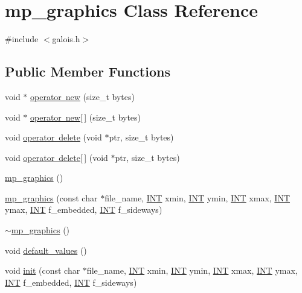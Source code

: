 \hypertarget{classmp__graphics}{}\section{mp\+\_\+graphics Class Reference}
\label{classmp__graphics}


{\ttfamily \#include $<$galois.\+h$>$}

\subsection*{Public Member Functions}
\begin{DoxyCompactItemize}
\item 
void $\ast$ \mbox{\hyperlink{classmp__graphics_a99f12c4a1faf7d84e64ad089e59bd43a}{operator new}} (size\+\_\+t bytes)
\item 
void $\ast$ \mbox{\hyperlink{classmp__graphics_a673779553f1615a209f393b56b7cd238}{operator new\mbox{[}$\,$\mbox{]}}} (size\+\_\+t bytes)
\item 
void \mbox{\hyperlink{classmp__graphics_a6837492938bddfa1192c3c68cc4c7626}{operator delete}} (void $\ast$ptr, size\+\_\+t bytes)
\item 
void \mbox{\hyperlink{classmp__graphics_a002d6cbdfd131c2925e1083781a9c8af}{operator delete\mbox{[}$\,$\mbox{]}}} (void $\ast$ptr, size\+\_\+t bytes)
\item 
\mbox{\hyperlink{classmp__graphics_abe331bd484651f2b734167ff09a30858}{mp\+\_\+graphics}} ()
\item 
\mbox{\hyperlink{classmp__graphics_af6b0c5e75689ccde95031f62a98c3dbf}{mp\+\_\+graphics}} (const char $\ast$file\+\_\+name, \mbox{\hyperlink{galois_8h_a09fddde158a3a20bd2dcadb609de11dc}{I\+NT}} xmin, \mbox{\hyperlink{galois_8h_a09fddde158a3a20bd2dcadb609de11dc}{I\+NT}} ymin, \mbox{\hyperlink{galois_8h_a09fddde158a3a20bd2dcadb609de11dc}{I\+NT}} xmax, \mbox{\hyperlink{galois_8h_a09fddde158a3a20bd2dcadb609de11dc}{I\+NT}} ymax, \mbox{\hyperlink{galois_8h_a09fddde158a3a20bd2dcadb609de11dc}{I\+NT}} f\+\_\+embedded, \mbox{\hyperlink{galois_8h_a09fddde158a3a20bd2dcadb609de11dc}{I\+NT}} f\+\_\+sideways)
\item 
\mbox{\hyperlink{classmp__graphics_ac0f9687c149d5579c95a32b07aa69683}{$\sim$mp\+\_\+graphics}} ()
\item 
void \mbox{\hyperlink{classmp__graphics_a7d407ae5a4cc589826f44e307e654bab}{default\+\_\+values}} ()
\item 
void \mbox{\hyperlink{classmp__graphics_a48eeaba8be672a2d5eee6b1f428b947e}{init}} (const char $\ast$file\+\_\+name, \mbox{\hyperlink{galois_8h_a09fddde158a3a20bd2dcadb609de11dc}{I\+NT}} xmin, \mbox{\hyperlink{galois_8h_a09fddde158a3a20bd2dcadb609de11dc}{I\+NT}} ymin, \mbox{\hyperlink{galois_8h_a09fddde158a3a20bd2dcadb609de11dc}{I\+NT}} xmax, \mbox{\hyperlink{galois_8h_a09fddde158a3a20bd2dcadb609de11dc}{I\+NT}} ymax, \mbox{\hyperlink{galois_8h_a09fddde158a3a20bd2dcadb609de11dc}{I\+NT}} f\+\_\+embedded, \mbox{\hyperlink{galois_8h_a09fddde158a3a20bd2dcadb609de11dc}{I\+NT}} f\+\_\+sideways)

\end{DoxyCompactItemize}
